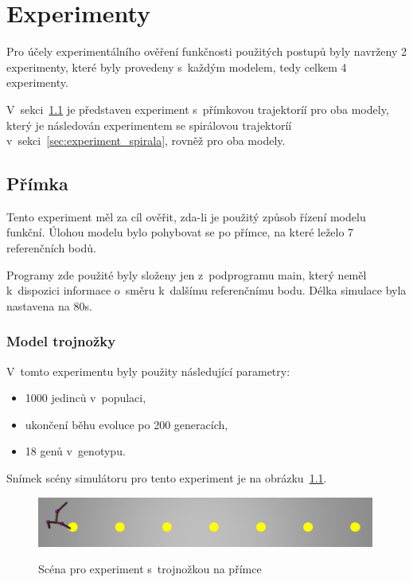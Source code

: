 
\chapter{Experimenty}
\label{chap:experimenty}
Pro účely experimentálního ověření funkčnosti použitých postupů byly navrženy 2 experimenty, které byly provedeny s~každým modelem, tedy celkem 4 experimenty.

V~sekci~\ref{sec:experiment_primka} je představen experiment s~přímkovou trajektoríí pro oba modely, který je následován experimentem se spirálovou trajektoríí v~sekci~\ref{sec:experiment_spirala}, rovněž pro oba modely.


\section{Přímka}
\label{sec:experiment_primka}

Tento experiment měl za cíl ověřit, zda-li je použitý způsob řízení modelu funkční.
Úlohou modelu bylo pohybovat se po přímce, na které leželo 7 referenčních bodů.

Programy zde použité byly složeny jen z~podprogramu main, který neměl k~dispozici informace o~směru k~dalšímu referenčnímu bodu.
Délka simulace byla nastavena na 80s.

\subsection{Model trojnožky}
V~tomto experimentu byly použity následující parametry:
\begin{itemize}
    \item 1000 jedinců v~populaci,
    \item ukončení běhu evoluce po 200 generacích,
    \item 18 genů v~genotypu.
\end{itemize}

Snímek scény simulátoru pro tento experiment je na obrázku~\ref{fig:trojnozka_primka_zhora}.
\begin{figure}[h]
    \centering
    {\includegraphics[width=30em]{obrazky/trojnozka_primka_zhora.png}}
    \caption{
    Scéna pro experiment s~trojnožkou na přímce
    }
    \label{fig:trojnozka_primka_zhora}
\end{figure}



